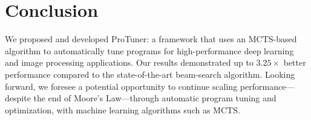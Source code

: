 \section{Conclusion}
We proposed and developed ProTuner: a framework that uses an MCTS-based algorithm to automatically tune programs for high-performance deep learning and image processing applications. Our results demonstrated up to $3.25\times$ better performance compared to the state-of-the-art beam-search algorithm. Looking forward, we foresee a potential opportunity to continue scaling performance---despite the end of Moore's Law---through automatic program tuning and optimization, with machine learning algorithms such as MCTS.